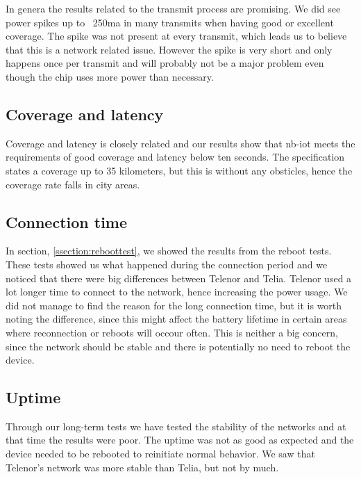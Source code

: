 \documentclass[USenglish]{ifimaster}  %
\begin{document}
In genera the results related to the transmit process are promising. We did see power spikes up to ~250\acrshort{ma} in many transmits when having good or excellent coverage. The spike was not present at every transmit, which leads us to believe that this is a network related issue. However the spike is very short and only happens once per transmit and will probably not be a major problem even though the chip uses more power than necessary.

\subsection{Coverage and latency}
Coverage and latency is closely related and our results show that \acrshort{nb-iot} meets the requirements of good coverage and latency below ten seconds. The specification states a coverage up to 35 kilometers, but this is without any obsticles, hence the coverage rate falls in city areas.

\subsection{Connection time}
In section, \vref{ssection:reboottest}, we showed the results from the reboot tests. These tests showed us what happened during the connection period and we noticed that there were big differences between Telenor and Telia. Telenor used a lot longer time to connect to the network, hence increasing the power usage. We did not manage to find the reason for the long connection time, but it is worth noting the difference, since this might affect the battery lifetime in certain areas where reconnection or reboots will occour often. This is neither a big concern, since the network should be stable and there is potentially no need to reboot the device.

\subsection{Uptime}
Through our long-term tests we have tested the stability of the networks and at that time the results were poor. The uptime was not as good as expected and the device needed to be rebooted to reinitiate normal behavior. We saw that Telenor's network was more stable than Telia, but not by much.
\end{document}

